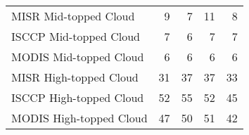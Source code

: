 \begin{tabular}{lrrrr}
   MISR Mid-topped Cloud &                        9 &                        7 &                       11 &                        8 \\
  ISCCP Mid-topped Cloud &                        7 &                        6 &                        7 &                        7 \\
  MODIS Mid-topped Cloud &                        6 &                        6 &                        6 &                        6 \\
  MISR High-topped Cloud &                       31 &                       37 &                       37 &                       33 \\
 ISCCP High-topped Cloud &                       52 &                       55 &                       52 &                       45 \\
 MODIS High-topped Cloud &                       47 &                       50 &                       51 &                       42 \\ \hline
\end{tabular}
